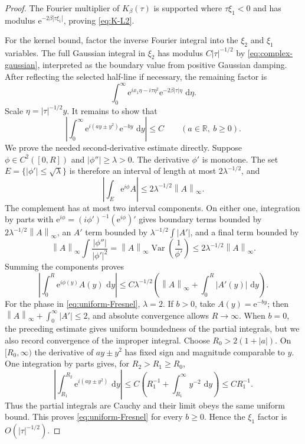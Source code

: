 \documentclass[11pt,oneside]{book}
\theoremstyle{definition}
\theoremstyle{remark}
\newcommand{\R}{\mathbb R}
\newcommand{\1}{\mathbf 1}
\newcommand{\dd}{\,\mathrm d}
\newcommand{\norm}[1]{\left\lVert #1\right\rVert}
\newcommand{\e}{\mathrm e}
\begin{document}
\begin{proof}
The Fourier multiplier of $K_\beta(\tau)$ is supported where
$\tau\xi_1<0$ and has modulus
$\e^{-2\beta|\tau\xi_1|}$, proving \eqref{eq:K-L2}.

For the kernel bound, factor the inverse Fourier integral into the $\xi_2$
and $\xi_1$ variables.  The full Gaussian integral in $\xi_2$ has modulus
$C|\tau|^{-1/2}$ by \eqref{eq:complex-gaussian}, interpreted as the
boundary value from positive Gaussian damping.  After reflecting the selected half-line if necessary, the
remaining factor is
\begin{equation}
 \int_0^\infty
 \e^{i x_1\eta-i\tau\eta^2}
 \e^{-2\beta|\tau|\eta}\,\dd\eta.                 \label{eq:half-Fresnel}
\end{equation}
Scale $\eta=|\tau|^{-1/2}y$.  It remains to show that
\[
 \left|\int_0^\infty
   \e^{i(ay\pm y^2)}\e^{-by}\,\dd y\right|\le C
 \qquad(a\in\R,\ b\ge0).                          \label{eq:uniform-Fresnel}
\]
We prove the needed second-derivative estimate directly.  Suppose
$\phi\in C^2([0,R])$ and $|\phi''|\ge\lambda>0$.  The derivative $\phi'$ is
monotone.  The set $E=\{|\phi'|\le\sqrt\lambda\}$ is therefore an interval
of length at most $2\lambda^{-1/2}$, and
\[
 \left|\int_E\e^{i\phi}A\right|
 \le2\lambda^{-1/2}\norm A_\infty.
\]
The complement has at most two interval components.  On either one,
integration by parts with
$\e^{i\phi}=(i\phi')^{-1}(\e^{i\phi})'$ gives boundary terms bounded by
$2\lambda^{-1/2}\norm A_\infty$, an $A'$ term bounded by
$\lambda^{-1/2}\int|A'|$, and a final term bounded by
\[
 \norm A_\infty\int\frac{|\phi''|}{|\phi'|^2}
 =\norm A_\infty\operatorname{Var}\!\left(\frac1{\phi'}\right)
 \le2\lambda^{-1/2}\norm A_\infty.
\]
Summing the components proves
\[
 \left|\int_0^R\e^{i\phi(y)}A(y)\,\dd y\right|
 \le C\lambda^{-1/2}
 \left(\norm A_\infty+\int_0^R|A'(y)|\,\dd y\right).
\]
For the phase in \eqref{eq:uniform-Fresnel}, $\lambda=2$.  If
$b>0$, take $A(y)=\e^{-by}$; then
$\norm A_\infty+\int_0^\infty|A'|\le2$, and absolute convergence allows
$R\to\infty$.  When $b=0$, the preceding estimate gives uniform boundedness
of the partial integrals, but we also record convergence of the improper
integral.  Choose $R_0>2(1+|a|)$.  On $[R_0,\infty)$ the derivative of
$ay\pm y^2$ has fixed sign and magnitude comparable to $y$.  One integration
by parts gives, for $R_2>R_1\ge R_0$,
\[
 \left|\int_{R_1}^{R_2}\e^{i(ay\pm y^2)}\,\dd y\right|
 \le C\left(R_1^{-1}+\int_{R_1}^\infty y^{-2}\,\dd y\right)
 \le CR_1^{-1}.
\]
Thus the partial integrals are Cauchy and their limit obeys the same uniform
bound.  This proves \eqref{eq:uniform-Fresnel} for every $b\ge0$.  Hence the
$\xi_1$ factor is $O(|\tau|^{-1/2})$.


\end{proof}
\end{document}
